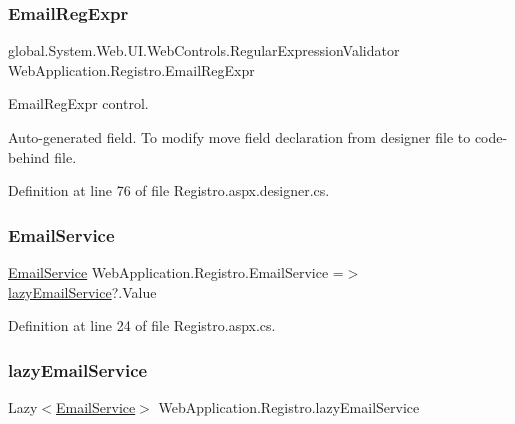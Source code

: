 \subsubsection{\texorpdfstring{EmailRegExpr}{EmailRegExpr}}
{\footnotesize\ttfamily global.\+System.\+Web.\+U\+I.\+Web\+Controls.\+Regular\+Expression\+Validator Web\+Application.\+Registro.\+Email\+Reg\+Expr\hspace{0.3cm}{\ttfamily [protected]}}



Email\+Reg\+Expr control. 

Auto-\/generated field. To modify move field declaration from designer file to code-\/behind file. 

Definition at line 76 of file Registro.\+aspx.\+designer.\+cs.

\mbox{\label{classWebApplication_1_1Registro_ab1c51ef2d472d1dd5d0118c1202fe320}} 
\subsubsection{\texorpdfstring{EmailService}{EmailService}}
{\footnotesize\ttfamily \mbox{\hyperlink{classEmailLib_1_1EmailService}{Email\+Service}} Web\+Application.\+Registro.\+Email\+Service =$>$ \mbox{\hyperlink{classWebApplication_1_1Registro_ab3596ca6d4c68364d6e109b9536b210a}{lazy\+Email\+Service}}?.Value\hspace{0.3cm}{\ttfamily [private]}}



Definition at line 24 of file Registro.\+aspx.\+cs.

\mbox{\label{classWebApplication_1_1Registro_ab3596ca6d4c68364d6e109b9536b210a}} 
\subsubsection{\texorpdfstring{lazyEmailService}{lazyEmailService}}
{\footnotesize\ttfamily Lazy$<$\mbox{\hyperlink{classEmailLib_1_1EmailService}{Email\+Service}}$>$ Web\+Application.\+Registro.\+lazy\+Email\+Service\hspace{0.3cm}{\ttfamily [private]}}



